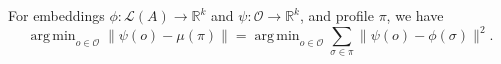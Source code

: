 \documentclass[prodmode,acmec]{ec-acmsmall}
\newcommand{\calL}{{\mathcal{L}}}
\newcommand{\rank}{{\calL(A)}}
\newcommand{\calO}{{\mathcal{O}}}
\DeclareMathOperator*{\argmin}{arg\,min}
\begin{document}
\begin{proposition}
For embeddings $\phi : \rank \rightarrow \mathbb{R}^k$ and $\psi: \calO \to \mathbb{R}^k$, and profile $\pi$, we have
\begin{equation}
\argmin_{o \in \calO} \|\psi(o)-\mu(\pi)\| = \argmin_{o \in \calO} \sum_{\sigma \in \pi} \|\psi(o)-\phi(\sigma)\|^2.
\label{eqn:discrete-mean}
\end{equation}
\label{prop:MPR-GSR-conversion}
\end{proposition}
\end{document}
